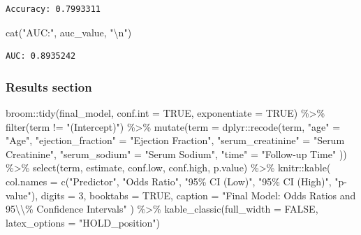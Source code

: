 \documentclass[
  letterpaper,
  DIV=11,
  numbers=noendperiod]{scrartcl}
\newenvironment{Shaded}{\begin{snugshade}}{\end{snugshade}}
\newcommand{\AttributeTok}[1]{\textcolor[rgb]{0.40,0.45,0.13}{#1}}
\newcommand{\ConstantTok}[1]{\textcolor[rgb]{0.56,0.35,0.01}{#1}}
\newcommand{\DecValTok}[1]{\textcolor[rgb]{0.68,0.00,0.00}{#1}}
\newcommand{\FunctionTok}[1]{\textcolor[rgb]{0.28,0.35,0.67}{#1}}
\newcommand{\NormalTok}[1]{\textcolor[rgb]{0.00,0.23,0.31}{#1}}
\newcommand{\OtherTok}[1]{\textcolor[rgb]{0.00,0.23,0.31}{#1}}
\newcommand{\SpecialCharTok}[1]{\textcolor[rgb]{0.37,0.37,0.37}{#1}}
\newcommand{\StringTok}[1]{\textcolor[rgb]{0.13,0.47,0.30}{#1}}
\begin{document}
\begin{verbatim}
Accuracy: 0.7993311 
\end{verbatim}

\begin{Shaded}
\begin{Highlighting}[]
\FunctionTok{cat}\NormalTok{(}\StringTok{"AUC:"}\NormalTok{, auc\_value, }\StringTok{"}\SpecialCharTok{\textbackslash{}n}\StringTok{"}\NormalTok{)}
\end{Highlighting}
\end{Shaded}

\begin{verbatim}
AUC: 0.8935242 
\end{verbatim}

\hypertarget{results-section}{%
\subsubsection{Results section}\label{results-section}}

\begin{Shaded}
\begin{Highlighting}[]
\NormalTok{broom}\SpecialCharTok{::}\FunctionTok{tidy}\NormalTok{(final\_model, }\AttributeTok{conf.int =} \ConstantTok{TRUE}\NormalTok{, }\AttributeTok{exponentiate =} \ConstantTok{TRUE}\NormalTok{) }\SpecialCharTok{\%\textgreater{}\%}
  \FunctionTok{filter}\NormalTok{(term }\SpecialCharTok{!=} \StringTok{"(Intercept)"}\NormalTok{) }\SpecialCharTok{\%\textgreater{}\%}
\FunctionTok{mutate}\NormalTok{(}\AttributeTok{term =}\NormalTok{ dplyr}\SpecialCharTok{::}\FunctionTok{recode}\NormalTok{(term,}
  \StringTok{"age"} \OtherTok{=} \StringTok{"Age"}\NormalTok{,}
  \StringTok{"ejection\_fraction"} \OtherTok{=} \StringTok{"Ejection Fraction"}\NormalTok{,}
  \StringTok{"serum\_creatinine"} \OtherTok{=} \StringTok{"Serum Creatinine"}\NormalTok{,}
  \StringTok{"serum\_sodium"} \OtherTok{=} \StringTok{"Serum Sodium"}\NormalTok{,}
  \StringTok{"time"} \OtherTok{=} \StringTok{"Follow{-}up Time"}
\NormalTok{)) }\SpecialCharTok{\%\textgreater{}\%}
  \FunctionTok{select}\NormalTok{(term, estimate, conf.low, conf.high, p.value) }\SpecialCharTok{\%\textgreater{}\%}
\NormalTok{  knitr}\SpecialCharTok{::}\FunctionTok{kable}\NormalTok{(}
    \AttributeTok{col.names =} \FunctionTok{c}\NormalTok{(}\StringTok{"Predictor"}\NormalTok{, }\StringTok{"Odds Ratio"}\NormalTok{, }\StringTok{"95\% CI (Low)"}\NormalTok{, }\StringTok{"95\% CI (High)"}\NormalTok{, }\StringTok{"p{-}value"}\NormalTok{),}
    \AttributeTok{digits =} \DecValTok{3}\NormalTok{,}
    \AttributeTok{booktabs =} \ConstantTok{TRUE}\NormalTok{,}
    \AttributeTok{caption =} \StringTok{"Final Model: Odds Ratios and 95}\SpecialCharTok{\textbackslash{}\textbackslash{}}\StringTok{\% Confidence Intervals"}
\NormalTok{  ) }\SpecialCharTok{\%\textgreater{}\%}
  \FunctionTok{kable\_classic}\NormalTok{(}\AttributeTok{full\_width =} \ConstantTok{FALSE}\NormalTok{, }\AttributeTok{latex\_options =} \StringTok{"HOLD\_position"}\NormalTok{)}
\end{Highlighting}
\end{Shaded}
\end{document}
